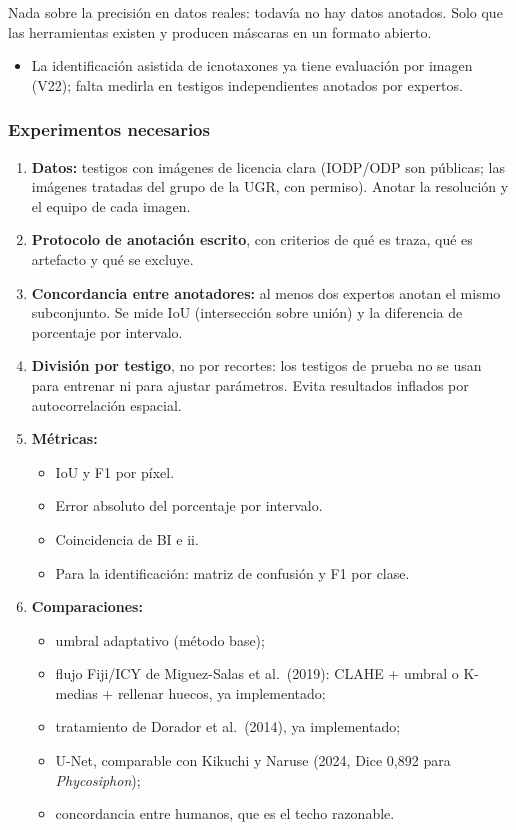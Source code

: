 \documentclass[
  10pt,
]{article}
\providecommand{\tightlist}{%
  \setlength{\itemsep}{0pt}\setlength{\parskip}{0pt}}
\begin{document}
Nada sobre la precisión en datos reales: todavía no hay datos anotados.
Solo que las herramientas existen y producen máscaras en un formato
abierto.

\begin{itemize}
\tightlist
\item
  La identificación asistida de icnotaxones ya tiene evaluación por
  imagen (V22); falta medirla en testigos independientes anotados por
  expertos.
\end{itemize}

\hypertarget{experimentos-necesarios}{%
\subsubsection{Experimentos necesarios}\label{experimentos-necesarios}}

\begin{enumerate}
\def\labelenumi{\arabic{enumi}.}
\tightlist
\item
  \textbf{Datos:} testigos con imágenes de licencia clara (IODP/ODP son
  públicas; las imágenes tratadas del grupo de la UGR, con permiso).
  Anotar la resolución y el equipo de cada imagen.
\item
  \textbf{Protocolo de anotación escrito}, con criterios de qué es
  traza, qué es artefacto y qué se excluye.
\item
  \textbf{Concordancia entre anotadores:} al menos dos expertos anotan
  el mismo subconjunto. Se mide IoU (intersección sobre unión) y la
  diferencia de porcentaje por intervalo.
\item
  \textbf{División por testigo}, no por recortes: los testigos de prueba
  no se usan para entrenar ni para ajustar parámetros. Evita resultados
  inflados por autocorrelación espacial.
\item
  \textbf{Métricas:}

  \begin{itemize}
  \tightlist
  \item
    IoU y F1 por píxel.
  \item
    Error absoluto del porcentaje por intervalo.
  \item
    Coincidencia de BI e ii.
  \item
    Para la identificación: matriz de confusión y F1 por clase.
  \end{itemize}
\item
  \textbf{Comparaciones:}

  \begin{itemize}
  \tightlist
  \item
    umbral adaptativo (método base);
  \item
    flujo Fiji/ICY de Miguez-Salas et al.~(2019): CLAHE + umbral o
    K-medias + rellenar huecos, ya implementado;
  \item
    tratamiento de Dorador et al.~(2014), ya implementado;
  \item
    U-Net, comparable con Kikuchi y Naruse (2024, Dice 0,892 para
    \emph{Phycosiphon});
  \item
    concordancia entre humanos, que es el techo razonable.
  \end{itemize}
\end{enumerate}
\end{document}
